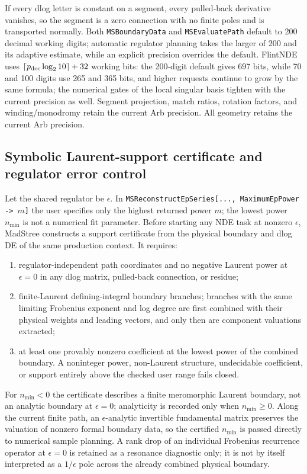\documentclass[11pt,a4paper]{article}
\begin{document}
If every dlog letter is constant on a segment, every pulled-back derivative vanishes, so the
segment is a zero connection with no finite poles and is transported normally. Both
\texttt{MSBoundaryData} and \texttt{MSEvaluatePath} default to 200 decimal working digits;
automatic regulator planning takes the larger of 200 and its adaptive estimate, while an explicit
precision overrides the default. FlintNDE uses $\lceil p_{\rm dec}\log_2 10\rceil+32$ working
bits: the 200-digit default gives 697 bits, while 70 and 100 digits use 265 and
365 bits, and higher requests continue to grow by the same formula; the numerical gates of
the local singular basis tighten with the current precision as well. Segment projection,
match ratios, rotation factors, and winding/monodromy retain the current Arb precision.
All geometry retains the current Arb precision.

\subsection{Symbolic Laurent-support certificate and regulator error control}

Let the shared regulator be $\epsilon$.  In
\texttt{MSReconstructEpSeries[..., MaximumEpPower -> $m$]} the user specifies only the
highest returned power $m$; the lowest power $n_{\min}$ is not a numerical fit parameter.
Before starting any NDE task at nonzero $\epsilon$, MadStree constructs a support certificate
from the physical boundary and dlog DE of the same production context.  It requires:
\begin{enumerate}[label=\arabic*.]
  \item regulator-independent path coordinates and no negative Laurent power at
  $\epsilon=0$ in any dlog matrix, pulled-back connection, or residue;
  \item finite-Laurent defining-integral boundary branches; branches with the same limiting
  Frobenius exponent and log degree are first combined with their physical weights and leading
  vectors, and only then are component valuations extracted;
  \item at least one provably nonzero coefficient at the lowest power of the combined boundary.
  A noninteger power, non-Laurent structure, undecidable coefficient, or support entirely above
  the checked user range fails closed.
\end{enumerate}
For $n_{\min}<0$ the certificate describes a finite meromorphic Laurent boundary, not an
analytic boundary at $\epsilon=0$; analyticity is recorded only when $n_{\min}\geq0$.
Along the current finite path, an $\epsilon$-analytic invertible fundamental matrix preserves
the valuation of nonzero formal boundary data, so the certified $n_{\min}$ is passed directly
to numerical sample planning.  A rank drop of an individual Frobenius recurrence operator at
$\epsilon=0$ is retained as a resonance diagnostic only; it is not by itself interpreted as a
$1/\epsilon$ pole across the already combined physical boundary.
\end{document}

